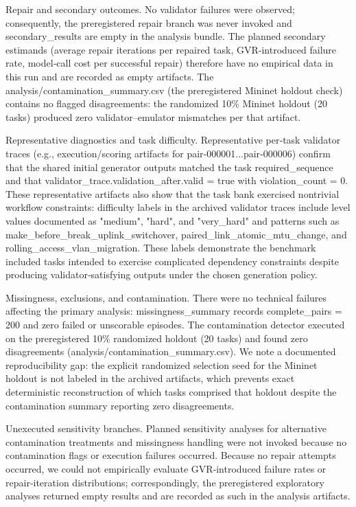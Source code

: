\documentclass[conference]{IEEEtran}
\begin{document}
Repair and secondary outcomes. No validator failures were observed; consequently, the preregistered repair branch was never invoked and secondary\_results are empty in the analysis bundle. The planned secondary estimands (average repair iterations per repaired task, GVR‑introduced failure rate, model‑call cost per successful repair) therefore have no empirical data in this run and are recorded as empty artifacts. The analysis/contamination\_summary.csv (the preregistered Mininet holdout check) contains no flagged disagreements: the randomized 10\% Mininet holdout (20 tasks) produced zero validator--emulator mismatches per that artifact.

Representative diagnostics and task difficulty. Representative per‑task validator traces (e.g., execution/scoring artifacts for pair‑000001...pair‑000006) confirm that the shared initial generator outputs matched the task required\_sequence and that validator\_trace.validation\_after.valid = true with violation\_count = 0. These representative artifacts also show that the task bank exercised nontrivial workflow constraints: difficulty labels in the archived validator traces include level values documented as "medium", "hard", and "very\_hard" and patterns such as make\_before\_break\_uplink\_switchover, paired\_link\_atomic\_mtu\_change, and rolling\_access\_vlan\_migration. These labels demonstrate the benchmark included tasks intended to exercise complicated dependency constraints despite producing validator‑satisfying outputs under the chosen generation policy.

Missingness, exclusions, and contamination. There were no technical failures affecting the primary analysis: missingness\_summary records complete\_pairs = 200 and zero failed or unscorable episodes. The contamination detector executed on the preregistered 10\% randomized holdout (20 tasks) and found zero disagreements (analysis/contamination\_summary.csv). We note a documented reproducibility gap: the explicit randomized selection seed for the Mininet holdout is not labeled in the archived artifacts, which prevents exact deterministic reconstruction of which tasks comprised that holdout despite the contamination summary reporting zero disagreements.

Unexecuted sensitivity branches. Planned sensitivity analyses for alternative contamination treatments and missingness handling were not invoked because no contamination flags or execution failures occurred. Because no repair attempts occurred, we could not empirically evaluate GVR‑introduced failure rates or repair‑iteration distributions; correspondingly, the preregistered exploratory analyses returned empty results and are recorded as such in the analysis artifacts.
\end{document}
